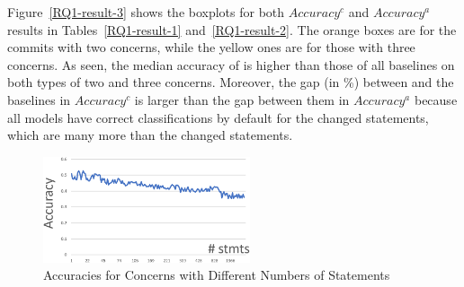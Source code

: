 
Figure~\ref{RQ1-result-3} shows the boxplots for both $Accuracy^c$ and
$Accuracy^a$ results in Tables~\ref{RQ1-result-1}
and~\ref{RQ1-result-2}. The orange boxes are for the commits with two
concerns, while the yellow ones are for those with three concerns. As
seen, the median accuracy of {\tool} is higher than those of all
baselines on both types of two and three concerns. Moreover, the gap
(in \%) between {\tool} and the baselines in $Accuracy^{c}$ is larger
than the gap between them in $Accuracy^{a}$ because all models have
correct classifications by default for the changed statements, which
are many more than the changed statements.


\begin{figure}[t]
	\centering \includegraphics[width=2.4in]{figures/accuracy-concerns-2.png}
	\vspace{-6pt}
	\caption{Accuracies for Concerns with Different Numbers of Statements}
	\label{acc-concerns}
\end{figure}

